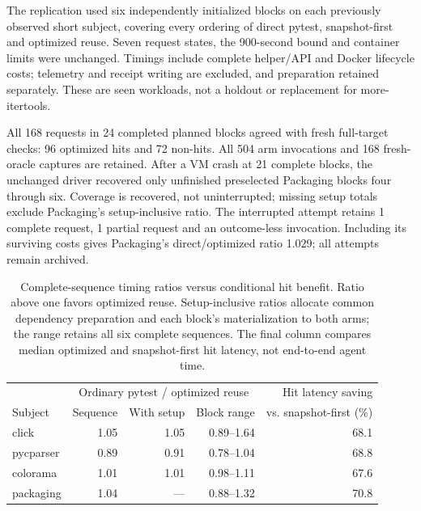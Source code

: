 \documentclass[preprint,12pt,a4paper]{elsarticle}
\begin{document}
The replication used six independently initialized blocks on each previously observed short subject, covering every ordering of direct pytest, snapshot-first and optimized reuse. Seven request states, the 900-second bound and container limits were unchanged. Timings include complete helper/API and Docker lifecycle costs; telemetry and receipt writing are excluded, and preparation retained separately. These are seen workloads, not a holdout or replacement for more-itertools.

All 168 requests in 24 completed planned blocks agreed with fresh full-target checks: 96 optimized hits and 72 non-hits. All 504 arm invocations and 168 fresh-oracle captures are retained. After a VM crash at 21 complete blocks, the unchanged driver recovered only unfinished preselected Packaging blocks four through six. Coverage is recovered, not uninterrupted; missing setup totals exclude Packaging's setup-inclusive ratio. The interrupted attempt retains 1 complete request, 1 partial request and an outcome-less invocation. Including its surviving costs gives Packaging's direct/optimized ratio 1.029; all attempts remain archived.

\begin{table}[htbp]
\centering\small
\begin{tabular}{@{}lrrrr@{}}
\toprule
 & \multicolumn{3}{c}{Ordinary pytest / optimized reuse} & Hit latency saving \\
Subject & Sequence & With setup & Block range & vs. snapshot-first (\%) \\
\midrule
click & 1.05 & 1.05 & 0.89--1.64 & 68.1 \\
pycparser & 0.89 & 0.91 & 0.78--1.04 & 68.8 \\
colorama & 1.01 & 1.01 & 0.98--1.11 & 67.6 \\
packaging & 1.04 & --- & 0.88--1.32 & 70.8 \\
\bottomrule
\end{tabular}
\caption{Complete-sequence timing ratios versus conditional hit benefit. Ratio above one favors optimized reuse. Setup-inclusive ratios allocate common dependency preparation and each block's materialization to both arms; the range retains all six complete sequences. The final column compares median optimized and snapshot-first hit latency, not end-to-end agent time.}
\label{tab:replication}
\end{table}
\end{document}
